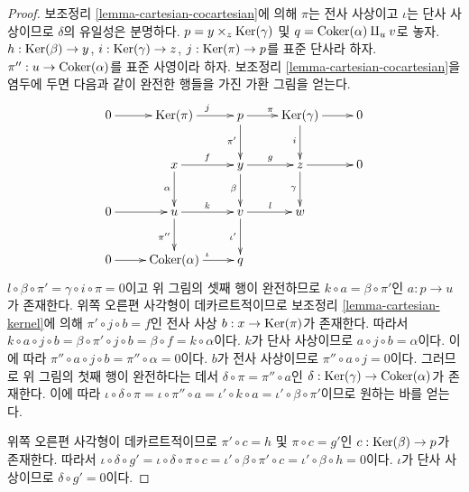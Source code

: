 \begin{proof}
보조정리 \ref{lemma-cartesian-cocartesian}에 의해 $\pi$는 전사 사상이고
$\iota$는 단사 사상이므로 $\delta$의 유일성은 분명하다.
$p = y \times_z \mathop{\mathrm{Ker}}(\gamma)$ 및
$q = \mathop{\mathrm{Coker}}(\alpha) \amalg_u v$로 놓자.
$h : \mathop{\mathrm{Ker}}(\beta) \to y$, $i : \mathop{\mathrm{Ker}}(\gamma) \to z$,
$j : \mathop{\mathrm{Ker}}(\pi) \to p$를 표준 단사라 하자.
$\pi'' : u \to \mathop{\mathrm{Coker}}(\alpha)$를 표준 사영이라 하자.
보조정리 \ref{lemma-cartesian-cocartesian}을 염두에 두면 다음과 같이
완전한 행들을 가진 가환 그림을 얻는다.
$$
\xymatrix{
0 \ar[r] &
\Ker(\pi) \ar[r]^j &
p \ar[r]^{\pi} \ar[d]_{\pi'} &
\Ker(\gamma) \ar[d]_i \ar[r] & 0 \\
& x \ar[r]^f \ar[d]_\alpha & y \ar[r]^g \ar[d]_\beta &
z \ar[d]_\gamma \ar[r] & 0 \\
0 \ar[r] & u \ar[r]^k \ar[d]_{\pi''} &
v \ar[r]^l \ar[d]_{\iota'} & w & \\
0 \ar[r] & \Coker(\alpha) \ar[r]^\iota & q & &
}
$$
$l \circ \beta \circ \pi' = \gamma \circ i \circ \pi = 0$이고 위 그림의
셋째 행이 완전하므로 $k \circ a = \beta \circ \pi'$인 $a : p \to u$가
존재한다. 위쪽 오른편 사각형이 데카르트적이므로 보조정리
\ref{lemma-cartesian-kernel}에 의해
$\pi' \circ j \circ b = f$인 전사 사상 $b : x \to \mathop{\mathrm{Ker}}(\pi)$가 존재한다.
따라서
$k \circ a \circ j \circ b = \beta \circ \pi' \circ j \circ b =
\beta \circ f = k \circ \alpha$이다.
$k$가 단사 사상이므로 $a \circ j \circ b = \alpha$이다. 이에 따라
$\pi'' \circ a \circ j \circ b = \pi'' \circ \alpha = 0$이다.
$b$가 전사 사상이므로 $\pi'' \circ a \circ j = 0$이다.
그러므로 위 그림의 첫째 행이 완전하다는 데서
$\delta \circ \pi = \pi'' \circ a$인
$\delta : \mathop{\mathrm{Ker}}(\gamma) \to \mathop{\mathrm{Coker}}(\alpha)$가 존재한다. 이에 따라
$\iota \circ \delta \circ \pi = \iota \circ \pi'' \circ a =
\iota' \circ k \circ a = \iota' \circ \beta \circ \pi'$이므로
원하는 바를 얻는다.

\medskip\noindent
위쪽 오른편 사각형이 데카르트적이므로
$\pi' \circ c = h$ 및 $\pi \circ c = g'$인
$c : \mathop{\mathrm{Ker}}(\beta) \to p$가 존재한다. 따라서
$\iota \circ \delta \circ g' = \iota \circ \delta \circ \pi \circ c =
\iota' \circ \beta \circ \pi' \circ c = \iota' \circ \beta \circ h = 0$이다.
$\iota$가 단사 사상이므로 $\delta \circ g' = 0$이다.


\end{proof}
